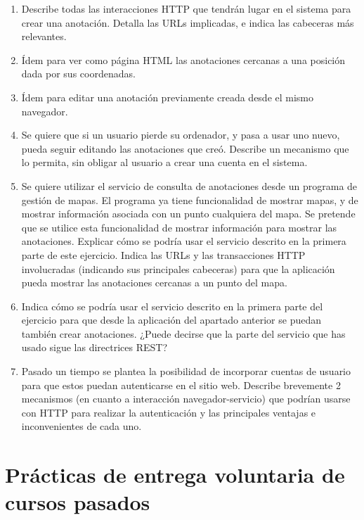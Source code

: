 {\begin{enumerate}
\item Describe todas las interacciones HTTP que tendrán lugar en el sistema
  para crear una anotación. Detalla las URLs implicadas, e indica las cabeceras más relevantes.
\item Ídem para ver como página HTML las anotaciones cercanas a una
  posición dada por sus coordenadas.
\item Ídem para editar una anotación previamente creada desde el mismo
  navegador.
\item Se quiere que si un usuario pierde su ordenador, y pasa a usar
  uno nuevo, pueda seguir editando las anotaciones que creó. Describe
  un mecanismo que lo permita, sin obligar al usuario a crear una
  cuenta en el sistema.
\item Se quiere utilizar el servicio de consulta de anotaciones desde
  un programa de gestión de mapas. El programa ya tiene funcionalidad
  de mostrar mapas, y de mostrar información asociada con un punto
  cualquiera del mapa. Se pretende que se utilice esta funcionalidad
  de mostrar información para mostrar las anotaciones. Explicar cómo
  se podría usar el servicio descrito en la primera parte de este
  ejercicio. Indica las URLs y las transacciones HTTP involucradas
  (indicando sus principales cabeceras) para que la aplicación pueda
  mostrar las anotaciones cercanas a un punto del mapa.
\item Indica cómo se podría usar el servicio descrito en la primera
  parte del ejercicio para que desde la aplicación
  del apartado anterior se puedan también crear anotaciones. ¿Puede
  decirse que la parte del servicio que has usado sigue las
  directrices REST?
\item Pasado un tiempo se plantea la posibilidad de incorporar cuentas
  de usuario para que estos puedan autenticarse en el sitio web.
  Describe brevemente 2 mecanismos (en cuanto a interacción
  navegador-servicio) que podrían usarse con HTTP para realizar la
  autenticación y las principales ventajas e inconvenientes de cada
  uno.
\end{enumerate}

\newpage

\section{Prácticas de entrega voluntaria de cursos pasados}

}
